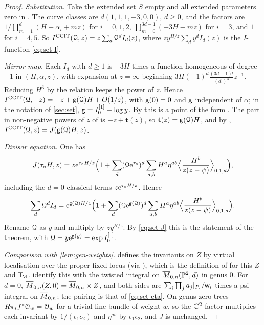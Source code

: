 \begin{proof}
\emph{Substitution.} Take the extended set $S$ empty and all extended parameters zero in \cite[eq.~(19)]{CCIT15}. The curve classes are $d(1,1,1,-3,0,0)$, $d\geq0$, and the factors are $1/\prod_{m=1}^d(H+\alpha_i+mz)$ for $i=0,1,2$, $\prod_{m=0}^{3d-1}(-3H-mz)$ for $i=3$, and $1$ for $i=4,5$. So $I^{\mathrm{CCIT}}(\mathcal{Q},z)=z\sum_d\mathcal{Q}^dI_d(z)$, where $zy^{H/z}\sum_dy^dI_d(z)$ is the $I$-function \cref{eq:set-I}.

\emph{Mirror map.} Each $I_d$ with $d\geq1$ is $-3H$ times a function homogeneous of degree $-1$ in $(H,\alpha,z)$, with expansion at $z=\infty$ beginning $3H(-1)^d\frac{(3d-1)!}{(d!)^3}z^{-1}$. Reducing $H^3$ by the relation keeps the power of $z$. Hence $I^{\mathrm{CCIT}}(\mathcal{Q},-z)=-z+\mathsf{g}(\mathcal{Q})H+O(1/z)$, with $\mathsf{g}(0)=0$ and $\mathsf{g}$ independent of $\alpha$; in the notation of \cref{sec:set}, $\mathsf{g}=I_0^{[1]}-\log y$. By \cite[Theorem 31]{CCIT15} this is a point of the form \cite[eq.~(4)]{CCIT15}. The part in non-negative powers of $z$ of \cite[eq.~(4)]{CCIT15} is $-z+\mathbf{t}(z)$, so $\mathbf{t}(z)=\mathsf{g}(\mathcal{Q})H$, and by \cite[Remark 3]{CCIT15}, $I^{\mathrm{CCIT}}(\mathcal{Q},z)=J(\mathsf{g}(\mathcal{Q})H,z)$.

\emph{Divisor equation.} One has
\[
J(\tau_\circ H,z)=z\mathrm{e}^{\tau_\circ H/z}\Big(1+\sum_d(\mathcal{Q}\mathrm{e}^{\tau_\circ})^d\sum_{a,b}H^a\eta^{ab}\Big\langle\frac{H^b}{z(z-\psi)}\Big\rangle_{0,1,d}\Big),
\]
including the $d=0$ classical terms $z\mathrm{e}^{\tau_\circ H/z}$. Hence
\[
\sum_d\mathcal{Q}^dI_d=\mathrm{e}^{\mathsf{g}(\mathcal{Q})H/z}\Big(1+\sum_d(\mathcal{Q}\mathrm{e}^{\mathsf{g}(\mathcal{Q})})^d\sum_{a,b}H^a\eta^{ab}\Big\langle\frac{H^b}{z(z-\psi)}\Big\rangle_{0,1,d}\Big).
\]
Rename $\mathcal{Q}$ as $y$ and multiply by $zy^{H/z}$. By \cref{eq:set-J} this is the statement of the theorem, with $\mathcal{Q}=y\mathrm{e}^{\mathsf{g}(y)}=\exp I_0^{[1]}$.

\emph{Comparison with \cref{lem:gen-weights}.} \cite[Section~2.2]{CCIT15} defines the invariants on $Z$ by virtual localisation over the proper fixed locus (via \cite[eq.~(51)]{Liu13}), which is the definition of \cite{BS} for this $Z$ and $\mathsf{T}_{\!\mathrm{M}}$.  identify this with the twisted integral on $\overline{M}_{0,n}(\mathbb{P}^2,d)$ in genus $0$. For $d=0$, $\overline{M}_{0,n}(Z,0)=\overline{M}_{0,n}\times Z$, and both sides are $\sum_i\prod_ja_j|_{P_i}/\mathsf{w}_i$ times a psi integral on $\overline{M}_{0,n}$; the pairing is that of \cref{eq:set-eta}. On genus-zero trees $R\pi_*f^*\mathcal{O}_{w}=\mathcal{O}_{w}$ for a trivial line bundle of weight $w$, so the $\mathbb{C}^2$ factor multiplies each invariant by $1/(\epsilon_1\epsilon_2)$ and $\eta^{ab}$ by $\epsilon_1\epsilon_2$, and $J$ is unchanged.
\end{proof}

